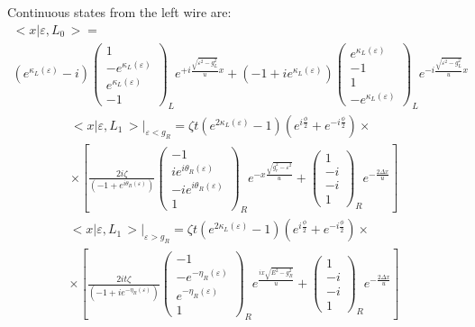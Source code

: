 Continuous states from the left wire are:
\begin{multline}
	\big<x\big|\varepsilon,L_{0}\,\big>=\\\left(e^{\ensuremath{\kappa_{L}\left(\varepsilon\right)}}-i\right)\begin{pmatrix}1\\
	-e^{\ensuremath{\kappa_{L}\left(\varepsilon\right)}}\\
	e^{\ensuremath{\kappa_{L}\left(\varepsilon\right)}}\\
	-1
	\end{pmatrix}_{L}e^{+i\frac{\sqrt{\varepsilon^{2}-g_{L}^{2}}}{u}x}+\left(-1+ie^{\ensuremath{\kappa_{L}\left(\varepsilon\right)}}\right)\begin{pmatrix}e^{\ensuremath{\kappa_{L}\left(\varepsilon\right)}}\\
	-1\\
	1\\
	-e^{\ensuremath{\kappa_{L}\left(\varepsilon\right)}}
	\end{pmatrix}_{L}e^{-i\frac{\sqrt{\varepsilon^{2}-g_{L}^{2}}}{u}x}
\end{multline}
\begin{multline}
	\big<x\big|\varepsilon,L_{1}\,\big>\Big|_{\varepsilon<g_{R}}=
	\zeta t\left(e^{2\kappa_{L}\left(\varepsilon\right)}-1\right)\left(e^{i\frac{\phi}{2}}+e^{-i\frac{\phi}{2}}\right)
	\times
	\\
	\times
	\left[\frac{2i\zeta}{\left(-1+e^{i\theta_{R}\left(\varepsilon\right)}\right)}\begin{pmatrix}-1\\
	ie^{i\theta_{R}\left(\varepsilon\right)}\\
	-ie^{i\theta_{R}\left(\varepsilon\right)}\\
	1
	\end{pmatrix}_{R}e^{-x\frac{\sqrt{g_{r}^{2}-\varepsilon^{2}}}{u}}+\begin{pmatrix}1\\
	-i\\
	-i\\
	1
	\end{pmatrix}_{R}e^{-\frac{2\Delta x}{u}}\right]
\end{multline}
\begin{multline}
	\big<x\big|\varepsilon,L_{1}\,\big>\Big|_{\varepsilon>g_{R}}=\zeta t\left(e^{2\kappa_{L}\left(\varepsilon\right)}-1\right)\left(e^{i\frac{\phi}{2}}+e^{-i\frac{\phi}{2}}\right)\times\\\times\left[\frac{2it\zeta}{\left(-1+ie^{-\eta_{R}\left(\varepsilon\right)}\right)}\begin{pmatrix}-1\\
	-e^{-\eta_{R}\left(\varepsilon\right)}\\
	e^{-\eta_{R}\left(\varepsilon\right)}\\
	1
	\end{pmatrix}_{R}e^{\frac{ix\sqrt{E^{2}-g_{R}^{2}}}{u}}+\begin{pmatrix}1\\
	-i\\
	-i\\
	1
	\end{pmatrix}_{R}e^{-\frac{2\Delta x}{u}}\right]
\end{multline}